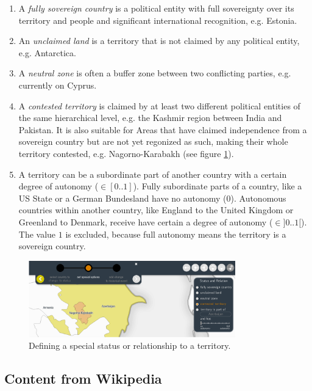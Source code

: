 \begin{enumerate}
  \item A \emph{fully sovereign country} is a political entity with full sovereignty over its territory and people and significant international recognition, e.g. Estonia.
  \item An \emph{unclaimed land} is a territory that is not claimed by any political entity, e.g. Antarctica.
  \item A \emph{neutral zone} is often a buffer zone between two conflicting parties, e.g. currently on Cyprus.
  \item A \emph{contested territory} is claimed by at least two different political entities of the same hierarchical level, e.g. the Kashmir region between India and Pakistan. It is also suitable for Areas that have claimed independence from a sovereign country but are not yet regonized as such, making their whole territory contested, e.g. Nagorno-Karabakh (see figure \ref{fig:uncertainty_new_status_tool}).
  \item A territory can be a subordinate part of another country with a certain degree of autonomy ($\in [0..1]$). Fully subordinate parts of a country, like a US State or a German Bundesland have no autonomy ($0$). Autonomous countries within another country, like England to the United Kingdom or Greenland to Denmark, receive have certain a degree of autonomy ($\in ]0..1[$). The value $1$ is excluded, because full autonomy means the territory is a sovereign country.
\end{enumerate}

\begin{figure}[ht]
  \centering
  \includegraphics[width = 0.8\textwidth]{graphics/extensions/new_status_tool}
  \caption{Defining a special status or relationship to a territory.}
  \label{fig:uncertainty_new_status_tool}
\end{figure}



\subsection{Content from Wikipedia} %
\label{sub:content_from_wikipedia}

